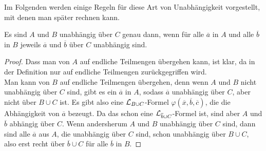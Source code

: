 Im Folgenden werden einige Regeln für diese Art von Unabhängigkeit vorgestellt, mit denen man später \glqq{}rechnen\grqq{} kann.

\begin{lemma}
	Es sind $A$ und $B$ unabhängig über $C$ genau dann, wenn für alle $\overline{a}$ in $A$ und alle $\overline{b}$ in $B$ jeweils $\overline{a}$ und $\overline{b}$ über $C$ unabhängig sind.
\end{lemma}
\begin{proof}
	Dass man von $A$ auf endliche Teilmengen übergehen kann, ist klar, da in der Definition nur auf endliche Teilmengen zurückgegriffen wird.\\
	Man kann von $B$ auf endliche Teilmengen übergehen, denn wenn $A$ und $B$ nicht unabhängig über $C$ sind, gibt es ein $\overline{a}$ in $A$, sodass $\overline{a}$ unabhängig über $C$, aber nicht über $B\cup C$ ist. Es gibt also eine $\mathcal{L}_{B\cup C}$-Formel $\varphi(\overline{x},\overline{b},\overline{c})$, die die Abhängigkeit von $\overline{a}$ bezeugt. Da das schon eine $\mathcal{L}_{\overline{b}\cup C}$-Formel ist, sind aber $A$ und $\overline{b}$ abhängig über $C$. Wenn andersherum $A$ und $B$ unabhängig über $C$ sind, dann sind alle $\overline{a}$ aus $A$, die unabhängig über $C$ sind, schon unabhängig über $B\cup C$, also erst recht über $\overline{b}\cup C$ für alle $\overline{b}$ in $B$.
\end{proof}

